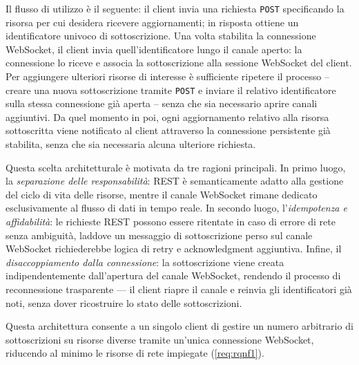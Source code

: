 Il flusso di utilizzo è il seguente: il client invia una richiesta \texttt{POST} specificando la risorsa per cui desidera ricevere aggiornamenti; in risposta ottiene un identificatore univoco di sottoscrizione. Una volta stabilita la connessione WebSocket, il client invia quell'identificatore lungo il canale aperto: la connessione lo riceve e associa la sottoscrizione alla sessione WebSocket del client. Per aggiungere ulteriori risorse di interesse è sufficiente ripetere il processo -- creare una nuova sottoscrizione tramite \texttt{POST} e inviare il relativo identificatore sulla stessa connessione già aperta -- senza che sia necessario aprire canali aggiuntivi. Da quel momento in poi, ogni aggiornamento relativo alla risorsa sottoscritta viene notificato al client attraverso la connessione persistente già stabilita, senza che sia necessaria alcuna ulteriore richiesta.

Questa scelta architetturale è motivata da tre ragioni principali. In primo luogo, la \textit{separazione delle responsabilità}: REST è semanticamente adatto alla gestione del ciclo di vita delle risorse, mentre il canale WebSocket rimane dedicato esclusivamente al flusso di dati in tempo reale. In secondo luogo, l'\textit{idempotenza e affidabilità}: le richieste REST possono essere ritentate in caso di errore di rete senza ambiguità, laddove un messaggio di sottoscrizione perso sul canale WebSocket richiederebbe logica di retry e acknowledgment aggiuntiva. Infine, il \textit{disaccoppiamento dalla connessione}: la sottoscrizione viene creata indipendentemente dall'apertura del canale WebSocket, rendendo il processo di reconnessione trasparente --- il client riapre il canale e reinvia gli identificatori già noti, senza dover ricostruire lo stato delle sottoscrizioni.

Questa architettura consente a un singolo client di gestire un numero arbitrario di sottoscrizioni su risorse diverse tramite un'unica connessione WebSocket, riducendo al minimo le risorse di rete impiegate (\ref{req:rqnf1}).
%